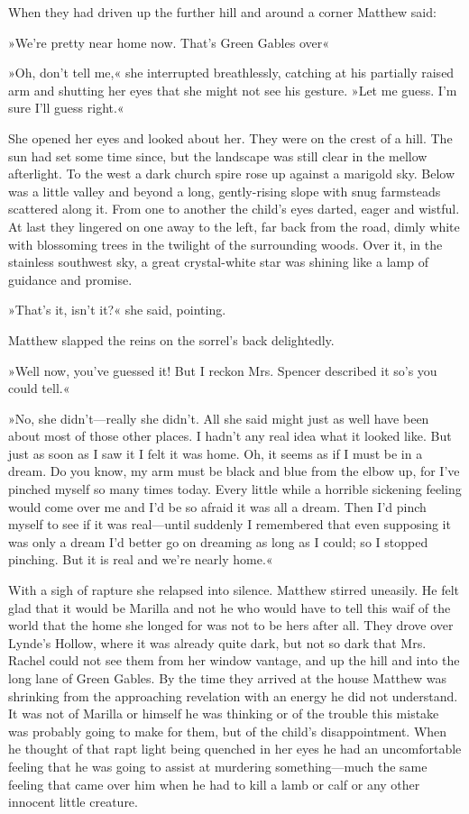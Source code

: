 When they had driven up the further hill and around a corner Matthew said:

»We're pretty near home now. That's Green Gables over\longdash«

»Oh, don't tell me,« she interrupted breathlessly, catching at his partially raised arm and shutting her eyes that she might not see his gesture. »Let me guess. I'm sure I'll guess right.«

She opened her eyes and looked about her. They were on the crest of a hill. The sun had set some time since, but the landscape was still clear in the mellow afterlight. To the west a dark church spire rose up against a marigold sky. Below was a little valley and beyond a long, gently-rising slope with snug farmsteads scattered along it. From one to another the child's eyes darted, eager and wistful. At last they lingered on one away to the left, far back from the road, dimly white with blossoming trees in the twilight of the surrounding woods. Over it, in the stainless southwest sky, a great crystal-white star was shining like a lamp of guidance and promise.

»That's it, isn't it?« she said, pointing.

Matthew slapped the reins on the sorrel's back delightedly.

»Well now, you've guessed it! But I reckon Mrs. Spencer described it so's you could tell.«

»No, she didn't—really she didn't. All she said might just as well have been about most of those other places. I hadn't any real idea what it looked like. But just as soon as I saw it I felt it was home. Oh, it seems as if I must be in a dream. Do you know, my arm must be black and blue from the elbow up, for I've pinched myself so many times today. Every little while a horrible sickening feeling would come over me and I'd be so afraid it was all a dream. Then I'd pinch myself to see if it was real—until suddenly I remembered that even supposing it was only a dream I'd better go on dreaming as long as I could; so I stopped pinching. But it is real and we're nearly home.«

With a sigh of rapture she relapsed into silence. Matthew stirred uneasily. He felt glad that it would be Marilla and not he who would have to tell this waif of the world that the home she longed for was not to be hers after all. They drove over Lynde's Hollow, where it was already quite dark, but not so dark that Mrs. Rachel could not see them from her window vantage, and up the hill and into the long lane of Green Gables. By the time they arrived at the house Matthew was shrinking from the approaching revelation with an energy he did not understand. It was not of Marilla or himself he was thinking or of the trouble this mistake was probably going to make for them, but of the child's disappointment. When he thought of that rapt light being quenched in her eyes he had an uncomfortable feeling that he was going to assist at murdering something—much the same feeling that came over him when he had to kill a lamb or calf or any other innocent little creature.

